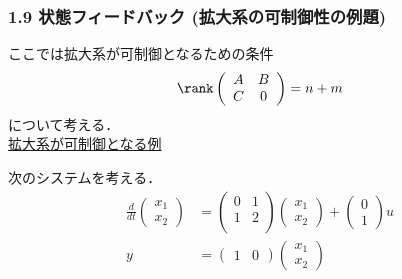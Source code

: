 \begin{frame}[t]
\frametitle{1.9 状態フィードバック (拡大系の可制御性の例題)}
ここでは拡大系が可制御となるための条件
\begin{equation}
   \rank \left(\begin{array}{cc}
          A & B \\
    C & 0
         \end{array}\right)
   = n + m
\end{equation}
について考える．\\

\noindent
\underline{拡大系が可制御となる例}

次のシステムを考える．
\begin{align}
 \frac{d}{dt}
 \left(
 \begin{array}{c}
  x_1 \\
  x_2
 \end{array}
 \right) &=
 \left(
 \begin{array}{cc}
  0 & 1 \\
  1 & 2 \\
 \end{array}
 \right)
 \left(
 \begin{array}{c}
  x_1 \\
  x_2
 \end{array}
 \right) +
 \left(
 \begin{array}{c}
  0 \\
  1
 \end{array}
 \right) u \\
 y &=
 \left(
 \begin{array}{cc}
  1 & 0
 \end{array}
 \right)
 \left(
 \begin{array}{c}
  x_1 \\
  x_2
 \end{array}
 \right)
\end{align}
\end{frame}


